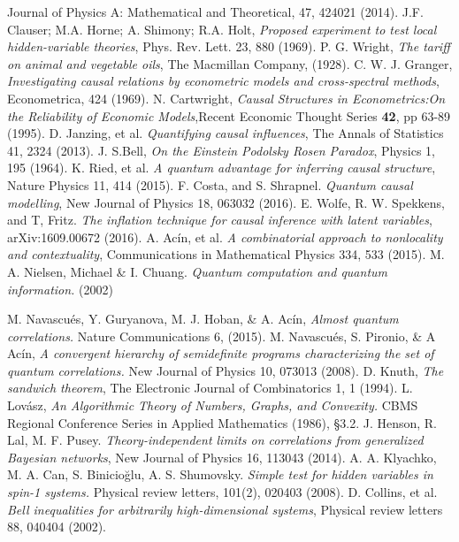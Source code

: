 \documentclass[letterpaper]{article}
\begin{document}
\begin{thebibliography}{}
         Journal of Physics A: Mathematical and Theoretical, 47, 424021
         (2014).
       J.F. Clauser; M.A. Horne; A. Shimony; R.A. Holt, {\em Proposed experiment to test local hidden-variable theories}, Phys. Rev. Lett. 23, 880 (1969).
     P. G. Wright, \emph{The tariff on animal and vegetable oils}, The Macmillan Company, (1928).
     C. W. J. Granger, \emph{Investigating causal relations by econometric models and cross-spectral methods}, Econometrica, 424 (1969).
     N. Cartwright, \emph{Causal Structures in Econometrics:On the Reliability of Economic Models},Recent Economic Thought Series \textbf{42}, pp 63-89 (1995).
          D. Janzing, et al. {\em Quantifying causal influences}, The Annals of Statistics 41, 2324 (2013).
      J. S.Bell, {\em On the Einstein Podolsky Rosen Paradox}, Physics 1, 195 (1964).
     K. Ried, et al. {\em A quantum advantage for inferring causal structure}, Nature Physics 11, 414 (2015).
       F. Costa, and S. Shrapnel. {\em Quantum causal modelling}, New Journal of Physics 18, 063032 (2016).
      E. Wolfe, R. W. Spekkens, and T, Fritz. {\em The inflation technique for causal inference with latent variables}, arXiv:1609.00672 (2016). 
     A. Acín, et al. {\em A combinatorial approach to nonlocality and contextuality}, Communications in Mathematical Physics 334, 533 (2015).
     M. A. Nielsen, Michael \& I. Chuang. 
    {\em Quantum computation and quantum information.} (2002)
    
      M. Navascués, Y. Guryanova, M. J. Hoban, \& A. Acín, {\em Almost quantum correlations.}
         Nature Communications 6, (2015).
      M. Navascués, S. Pironio, \& A Acín, 
         {\em A convergent hierarchy of semidefinite programs characterizing the
         set of quantum correlations.}
         New Journal of Physics 10, 073013 (2008).
    D. Knuth, {\em The sandwich theorem}, The Electronic Journal of Combinatorics 1, 1 (1994).
      L. Lovász, 
         {\em An Algorithmic Theory of Numbers, Graphs, and Convexity.}
         CBMS Regional Conference Series in Applied Mathematics (1986), §3.2.
  J. Henson, R. Lal, M. F. Pusey. {\em Theory-independent limits on correlations from generalized Bayesian networks}, New Journal of Physics 16, 113043 (2014).
    A. A. Klyachko, M. A. Can, S. Binicioğlu, A. S. Shumovsky. {\em Simple test for hidden variables in spin-1 systems.}
         Physical review letters, 101(2), 020403 (2008).
    D. Collins, et al. {\em Bell inequalities for arbitrarily high-dimensional systems}, Physical review letters 88, 040404 (2002).
   

\end{thebibliography}
\end{document}
